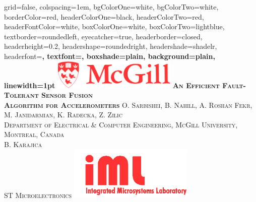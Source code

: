 \documentclass[landscape,final,a0paper,fontscale=0.285]{baposter}
\begin{document}
\begin{poster}%
  {
  grid=false,
  colspacing=1em,
  bgColorOne=white,
  bgColorTwo=white,
  borderColor=red,
  headerColorOne=black,
  headerColorTwo=red,
  headerFontColor=white,
  boxColorOne=white,
  boxColorTwo=lightblue,
  textborder=roundedleft,
  eyecatcher=true,
  headerborder=closed,
  headerheight=0.2\textheight,
  headershape=roundedright,
  headershade=shadelr,
  headerfont=\Large\bf\textsc, %
  textfont={\setlength{\parindent}{1.5em}},
  boxshade=plain,
  background=plain,
  linewidth=1pt
  }
  {\includegraphics[width=16em]{images/mcgill_logo}} 
  {\bf\textsc{\larger An Efficient Fault-Tolerant Sensor Fusion \\ \vspace{0.2em} Algorithm for Accelerometers}\vspace{0.3em} }
  {\textsc{O. Sarbishei, B. Nahill, A. Roshan Fekr, M. Janidarmian, K. Radecka, Z. Zilic \\
  {\smaller Department of Electrical \& Computer Engineering, McGill University, Montreal, Canada} \\
  B. Karajica \\
  {\smaller ST Microelectronics}
  }}
  {\includegraphics[width=16em]{images/logo_iml_red}}


    \newcommand{\colouredcircle}{%
      \tikz{\useasboundingbox (-0.2em,-0.32em) rectangle(0.2em,0.32em); \draw[draw=black,fill=lightblue,line width=0.03em] (0,0) circle(0.18em);}}


\end{poster}
\end{document}
